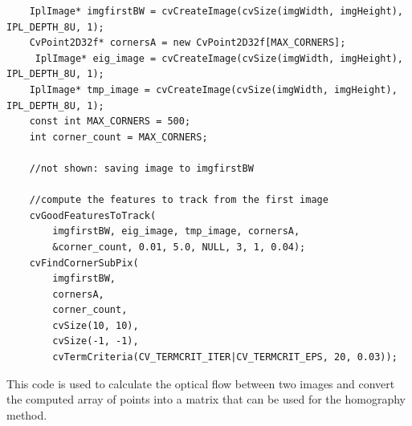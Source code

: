 \documentclass{article}
\begin{document}
\begin{verbatim}
    IplImage* imgfirstBW = cvCreateImage(cvSize(imgWidth, imgHeight), IPL_DEPTH_8U, 1);
    CvPoint2D32f* cornersA = new CvPoint2D32f[MAX_CORNERS];
     IplImage* eig_image = cvCreateImage(cvSize(imgWidth, imgHeight), IPL_DEPTH_8U, 1);
    IplImage* tmp_image = cvCreateImage(cvSize(imgWidth, imgHeight), IPL_DEPTH_8U, 1);
    const int MAX_CORNERS = 500;
    int corner_count = MAX_CORNERS;
 
    //not shown: saving image to imgfirstBW

    //compute the features to track from the first image
    cvGoodFeaturesToTrack(
        imgfirstBW, eig_image, tmp_image, cornersA, 
        &corner_count, 0.01, 5.0, NULL, 3, 1, 0.04);
    cvFindCornerSubPix(
        imgfirstBW, 
        cornersA, 
        corner_count, 
        cvSize(10, 10), 
        cvSize(-1, -1), 
        cvTermCriteria(CV_TERMCRIT_ITER|CV_TERMCRIT_EPS, 20, 0.03));
\end{verbatim}

This code is used to calculate the optical flow between two images and convert
the computed array of points into a matrix that can be used for the homography
method.
\end{document}
